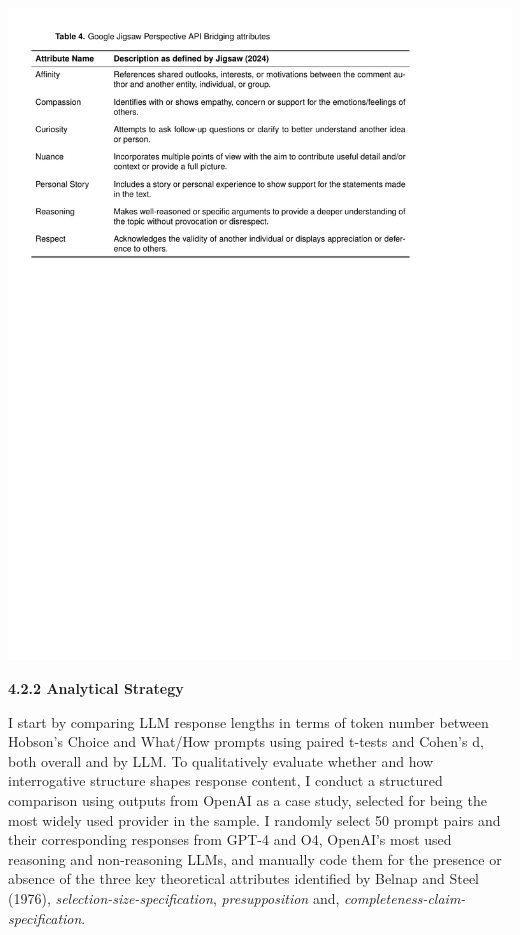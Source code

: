 \documentclass[
  12pt,
]{article}
\begin{document}
\begin{center}\includegraphics{../03_outputs/03_experimental_analyses/table_4} \end{center}

\textbf{4.2.2 Analytical Strategy}

I start by comparing LLM response lengths in terms of token number between Hobson's Choice and What/How prompts using paired t-tests and Cohen's d, both overall and by LLM. To qualitatively evaluate whether and how interrogative structure shapes response content, I conduct a structured comparison using outputs from OpenAI as a case study, selected for being the most widely used provider in the sample. I randomly select 50 prompt pairs and their corresponding responses from GPT-4 and O4, OpenAI's most used reasoning and non-reasoning LLMs, and manually code them for the presence or absence of the three key theoretical attributes identified by Belnap and Steel (1976), \emph{selection-size-specification}, \emph{presupposition} and, \emph{completeness-claim-specification}.
\end{document}
